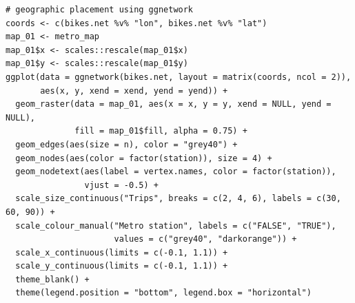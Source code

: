 \begin{knitrout}
\color{fgcolor}\begin{kframe}
\begin{verbatim}
# geographic placement using ggnetwork
coords <- c(bikes.net %v% "lon", bikes.net %v% "lat")
map_01 <- metro_map
map_01$x <- scales::rescale(map_01$x)
map_01$y <- scales::rescale(map_01$y)
ggplot(data = ggnetwork(bikes.net, layout = matrix(coords, ncol = 2)),
       aes(x, y, xend = xend, yend = yend)) +
  geom_raster(data = map_01, aes(x = x, y = y, xend = NULL, yend = NULL),
              fill = map_01$fill, alpha = 0.75) +
  geom_edges(aes(size = n), color = "grey40") +
  geom_nodes(aes(color = factor(station)), size = 4) +
  geom_nodetext(aes(label = vertex.names, color = factor(station)),
                vjust = -0.5) +
  scale_size_continuous("Trips", breaks = c(2, 4, 6), labels = c(30, 60, 90)) +
  scale_colour_manual("Metro station", labels = c("FALSE", "TRUE"),
                      values = c("grey40", "darkorange")) +
  scale_x_continuous(limits = c(-0.1, 1.1)) +
  scale_y_continuous(limits = c(-0.1, 1.1)) +
  theme_blank() +
  theme(legend.position = "bottom", legend.box = "horizontal")
\end{verbatim}
\end{kframe}
\end{knitrout}
